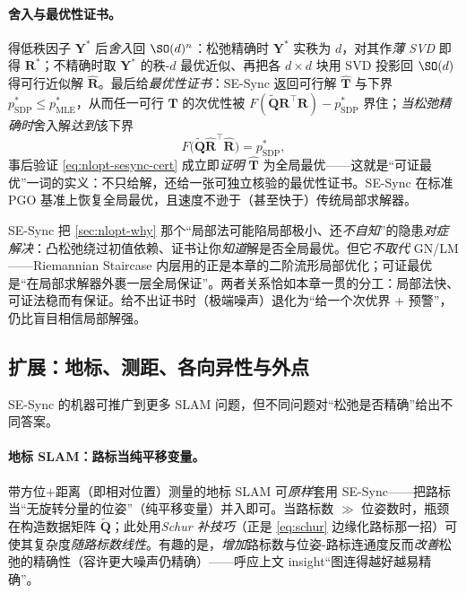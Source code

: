 \paragraph{舍入与最优性证书。}\cite{rosen2019sesync}
得低秩因子 $\mathbf{Y}^*$ 后\emph{舍入}回 $\SO(d)^n$：松弛精确时 $\mathbf{Y}^*$ 实秩为 $d$，对其作\emph{薄 SVD} 即得 $\mathbf{R}^*$；不精确时取 $\mathbf{Y}^*$ 的秩-$d$ 最优近似、再把各 $d\times d$ 块用 SVD 投影回 $\SO(d)$ 得可行近似解 $\hat{\mathbf{R}}$。最后给\emph{最优性证书}：SE-Sync 返回可行解 $\hat{\mathbf{T}}$ 与下界 $p^*_{\mathrm{SDP}}\le p^*_{\mathrm{MLE}}$，从而任一可行 $\mathbf{T}$ 的次优性被 $F(\tilde{\mathbf{Q}}\mathbf{R}^\top\mathbf{R})-p^*_{\mathrm{SDP}}$ 界住；\emph{当松弛精确时}舍入解\emph{达到}该下界
\begin{equation}
  F\!\big(\tilde{\mathbf{Q}}\hat{\mathbf{R}}^\top\hat{\mathbf{R}}\big)=p^*_{\mathrm{SDP}},
  \label{eq:nlopt-sesync-cert}
\end{equation}
事后验证 \cref{eq:nlopt-sesync-cert} 成立即\emph{证明} $\hat{\mathbf{T}}$ 为全局最优——这就是“可证最优”一词的实义：不只给解，还给一张可独立核验的最优性证书。SE-Sync 在标准 PGO 基准上恢复全局最优，且速度不逊于（甚至快于）传统局部求解器。

\begin{insight}[可证最优 $=$ 凸松弛 $+$ 事后证书；与本章局部法互补]
SE-Sync 把 \cref{sec:nlopt-why} 那个“局部法可能陷局部极小、还\emph{不自知}”的隐患\emph{对症解决}：凸松弛绕过初值依赖、证书让你\emph{知道}解是否全局最优。但它\emph{不取代} GN/LM——Riemannian Staircase 内层用的正是本章的二阶流形局部优化；可证最优是“在局部求解器外裹一层全局保证”。两者关系恰如本章一贯的分工：局部法快、可证法稳而有保证。给不出证书时（极端噪声）退化为“给一个次优界 $+$ 预警”，仍比盲目相信局部解强。
\end{insight}

\subsection{扩展：地标、测距、各向异性与外点}
\label{sec:nlopt-certifiable-ext}

SE-Sync 的机器可推广到更多 SLAM 问题，但不同问题对“松弛是否精确”给出不同答案\cite{rosen2019sesync,carlone2026handbook}。

\paragraph{地标 SLAM：路标当纯平移变量。}\cite{rosen2019sesync}
带方位$+$距离（即相对位置）测量的地标 SLAM 可\emph{原样}套用 SE-Sync——把路标当“无旋转分量的位姿”（纯平移变量）并入即可。当路标数 $\gg$ 位姿数时，瓶颈在构造数据矩阵 $\tilde{\mathbf{Q}}$；此处用\emph{Schur 补技巧}（正是 \cref{eq:schur} 边缘化路标那一招）可使其复杂度\emph{随路标数线性}。有趣的是，\emph{增加}路标数与位姿-路标连通度反而\emph{改善}松弛的精确性（容许更大噪声仍精确）——呼应上文 insight“图连得越好越易精确”。

